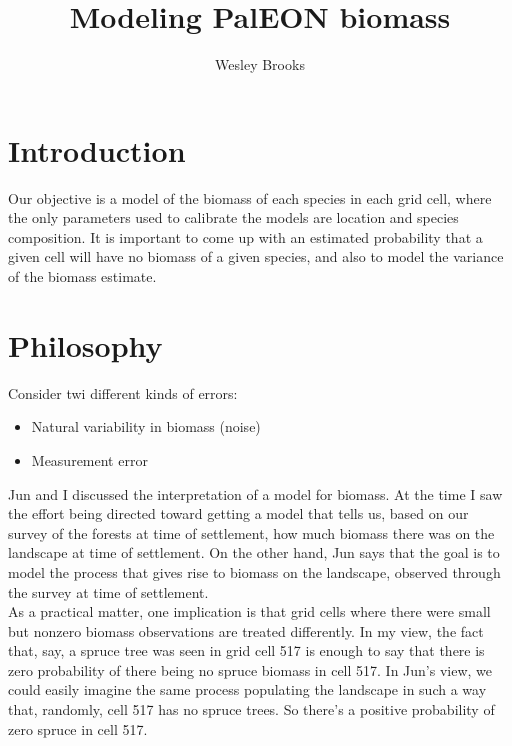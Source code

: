 \documentclass[authoryear, review, 11pt]{elsarticle}
\title{Modeling PalEON biomass}
\author{Wesley Brooks}
\date{}                                           %
\begin{document}
\maketitle


\section{Introduction}
Our objective is a  model of the biomass of each species in each grid cell, where the only parameters used to calibrate the models are location and species composition. It is important to come up with an estimated probability that a given cell will have no biomass of a given species, and also to model the variance of the biomass estimate.\\


\section{Philosophy}
Consider twi different kinds of errors:

\begin{itemize}
  \item Natural variability in biomass (noise)
  \item Measurement error
\end{itemize}

Jun and I discussed the interpretation of a model for biomass. At the time I saw the effort being directed toward getting a model that tells us, based on our survey of the forests at time of settlement, how much biomass there was on the landscape at time of settlement. On the other hand, Jun says that the goal is to model the process that gives rise to biomass on the landscape, observed through the survey at time of settlement.\\

As a practical matter, one implication is that grid cells where there were small but nonzero biomass observations are treated differently. In my view, the fact that, say, a spruce tree was seen in grid cell 517 is enough to say that there is zero probability of there being no spruce biomass in cell 517. In Jun's view, we could easily imagine the same process populating the landscape in such a way that, randomly, cell 517 has no spruce trees. So there's a positive probability of zero spruce in cell 517.\\
\end{document}
